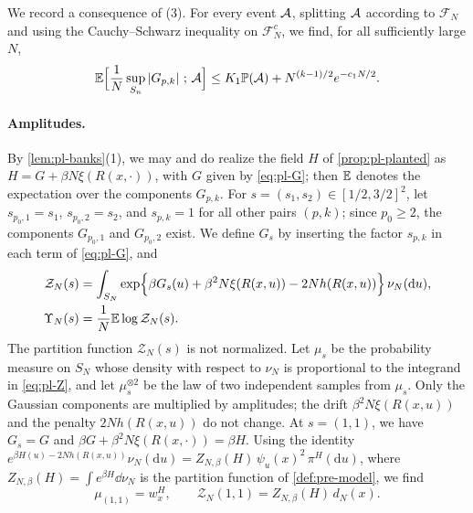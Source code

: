 We record a consequence of (3). For every event $\mathcal A$, splitting $\mathcal A$ according to $\mathcal F_N$ and using the Cauchy--Schwarz inequality on $\mathcal F_N^c$, we find, for all sufficiently large $N$,
\begin{equation}\label{eq:pl-ui}
\mathbb E\Bigl[\frac1N\sup_{S_n}\left|G_{p,k}\right|\,;\,\mathcal A\Bigr]\le K_1\mathbb P(\mathcal A)+N^{(k-1)/2}e^{-c_1N/2}.
\end{equation}

\paragraph{Amplitudes.}
By \cref{lem:pl-banks}(1), we may and do realize the field $H$ of \cref{prop:pl-planted} as $H=G+\beta N\xi(R(x,\cdot))$, with $G$ given by \eqref{eq:pl-G}; then $\mathbb E$ denotes the expectation over the components $G_{p,k}$. For $s=(s_1,s_2)\in[1/2,3/2]^2$, let $s_{p_0,1}=s_1$, $s_{p_0,2}=s_2$, and $s_{p,k}=1$ for all other pairs $(p,k)$; since $p_0\ge2$, the components $G_{p_0,1}$ and $G_{p_0,2}$ exist. We define $G_s$ by inserting the factor $s_{p,k}$ in each term of \eqref{eq:pl-G}, and
\begin{equation}\label{eq:pl-Z}
\begin{aligned}
\mathcal Z_N(s)&=\int_{S_N}\exp\Bigl\{\beta G_s(u)+\beta^2N\xi(R(x,u))-2Nh(R(x,u))\Bigr\}\,\nu_N(\mathrm du),\\
\Upsilon_N(s)&=\frac1N\mathbb E\log\mathcal Z_N(s).
\end{aligned}
\end{equation}
The partition function $\mathcal Z_N(s)$ is not normalized. Let $\mu_s$ be the probability measure on $S_N$ whose density with respect to $\nu_N$ is proportional to the integrand in \eqref{eq:pl-Z}, and let $\mu_s^{\otimes2}$ be the law of two independent samples from $\mu_s$. Only the Gaussian components are multiplied by amplitudes; the drift $\beta^2N\xi(R(x,u))$ and the penalty $2Nh(R(x,u))$ do not change. At $s=(1,1)$, we have $G_s=G$ and $\beta G+\beta^2N\xi(R(x,\cdot))=\beta H$. Using the identity $e^{\beta H(u)-2Nh(R(x,u))}\nu_N(\mathrm du)=Z_{N,\beta}(H)\,\psi_u(x)^2\,\pi^H(\mathrm du)$, where $Z_{N,\beta}(H)=\int e^{\beta H}\dd\nu_N$ is the partition function of \cref{def:pre-model}, we find
\begin{equation}\label{eq:pl-mu1}
\mu_{(1,1)}=w_x^H,\qquad\mathcal Z_N(1,1)=Z_{N,\beta}(H)\,d_N(x).
\end{equation}

